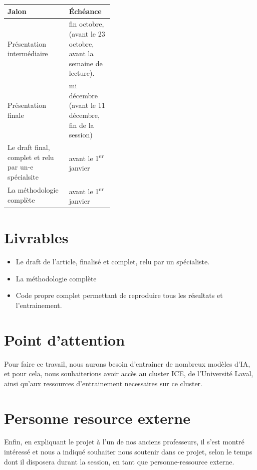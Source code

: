 \documentclass[11pt,a4paper]{article}
\begin{document}
\begin{tabularx}{\linewidth}{@{}X>{\raggedright\arraybackslash}p{0.42\linewidth}@{}}
    \toprule
    \textbf{Jalon} & \textbf{Échéance} \\
    \midrule
    Présentation intermédiaire & fin octobre, (avant le 23 octobre, avant la semaine de lecture). \\
    \addlinespace
    Présentation finale & mi décembre (avant le 11 décembre, fin de la session) \\
    \addlinespace
    Le draft final, complet et relu par un-e spécialsite & avant le 1\textsuperscript{er} janvier \\
    \addlinespace
    La méthodologie complète & avant le 1\textsuperscript{er} janvier \\
    \bottomrule
\end{tabularx}
\section{Livrables}
\begin{itemize}[leftmargin=1.5em,itemsep=2pt]
    \item Le draft de l'article, finalisé et complet, relu par un spécialiste.
    \item La méthodologie complète
    \item Code propre complet permettant de reproduire tous les résultats et l'entrainement.
\end{itemize}

\section{Point d'attention}

Pour faire ce travail, nous aurons besoin d'entrainer de nombreux modèles d'IA, et pour cela, nous souhaiterions avoir accès au cluster ICE, de l'Université Laval, ainsi qu'aux ressources d'entrainement necessaires sur ce cluster.

\section{Personne resource externe}
Enfin, en expliquant le projet à l’un de nos anciens professeurs, il s’est montré intéressé et nous a indiqué souhaiter nous soutenir dans ce projet, selon le temps dont il disposera durant la session, en tant que personne-ressource externe. 
\end{document}
